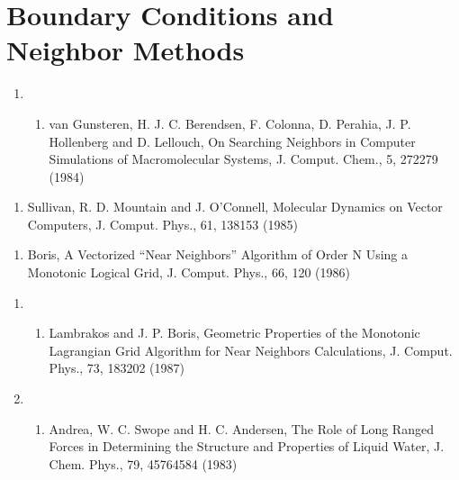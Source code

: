 \documentclass[letterpaper,11pt,english]{sphinxmanual}
\begin{document}
\section{Boundary Conditions and Neighbor Methods}
\label{\detokenize{text/references:boundary-conditions-and-neighbor-methods}}\begin{enumerate}
%
\setcounter{enumi}{22}
\item {} \begin{enumerate}
%
\setcounter{enumii}{5}
\item {} 
van Gunsteren, H. J. C. Berendsen, F. Colonna, D. Perahia, J. P. Hollenberg and D. Lellouch, On Searching Neighbors in Computer Simulations of Macromolecular Systems, J. Comput. Chem., 5, 272\sphinxhyphen{}279  (1984)

\end{enumerate}

\end{enumerate}
\begin{enumerate}
%
\setcounter{enumi}{5}
\item {} 
Sullivan, R. D. Mountain and J. O’Connell, Molecular Dynamics on Vector Computers, J. Comput. Phys., 61, 138\sphinxhyphen{}153 (1985)

\end{enumerate}
\begin{enumerate}
%
\setcounter{enumi}{9}
\item {} 
Boris, A Vectorized “Near Neighbors” Algorithm of Order N Using a Monotonic Logical Grid, J. Comput. Phys., 66, 1\sphinxhyphen{}20 (1986)

\end{enumerate}
\begin{enumerate}
%
\setcounter{enumi}{18}
\item {} \begin{enumerate}
%
\setcounter{enumii}{6}
\item {} 
Lambrakos and J. P. Boris, Geometric Properties of the Monotonic Lagrangian Grid Algorithm for Near Neighbors Calculations, J. Comput. Phys., 73, 183\sphinxhyphen{}202 (1987)

\end{enumerate}

\item {} \begin{enumerate}
%
\item {} 
Andrea, W. C. Swope and H. C. Andersen, The Role of Long Ranged Forces in Determining the Structure and Properties of Liquid Water, J. Chem. Phys., 79, 4576\sphinxhyphen{}4584 (1983)

\end{enumerate}

\end{enumerate}
\end{document}
